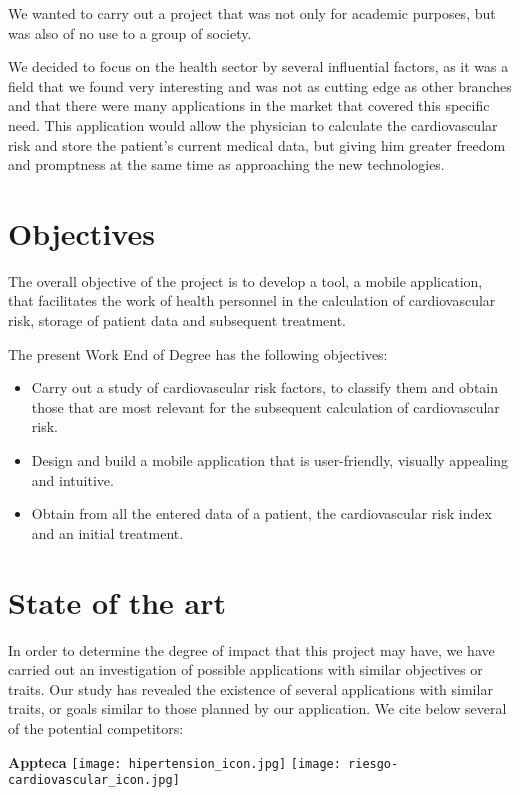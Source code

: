 \documentclass[11pt,spanish,
		listoftables,listoffigures]
		{tfgplantilla}
\begin{document}
We wanted to carry out a project that was not only for academic purposes, but was also of no use to a group of society.

We decided to focus on the health sector by several influential factors, as it was a field that we found very interesting and was not as cutting edge as other branches and that there were many applications in the market that covered this specific need.
This application would allow the physician to calculate the cardiovascular risk and store the patient's current medical data, but giving him greater freedom and promptness at the same time as approaching the new technologies.

\vfill
\section{Objectives}

The overall objective of the project is to develop a tool, a mobile application, that facilitates the work of health personnel in the calculation of cardiovascular risk, storage of patient data and subsequent treatment.

The present Work End of Degree has the following objectives:
\begin{itemize}
	\item Carry out a study of cardiovascular risk factors, to classify them and obtain those that are most relevant for the subsequent calculation of cardiovascular risk.
	\item Design and build a mobile application that is user-friendly, visually appealing and intuitive.
	\item Obtain from all the entered data of a patient, the cardiovascular risk index and an initial treatment.
\end{itemize}

\section{State of the art}

In order to determine the degree of impact that this project may have, we have carried out an investigation of possible applications with similar objectives or traits. Our study has revealed the existence of several applications with similar traits, or goals similar to those planned by our application. We cite below several of the potential competitors:

\noindent
\textbf {Appteca }
\texttt{[image: hipertension\_icon.jpg]}
\texttt{[image: riesgo-cardiovascular\_icon.jpg]}  
\end{document}
